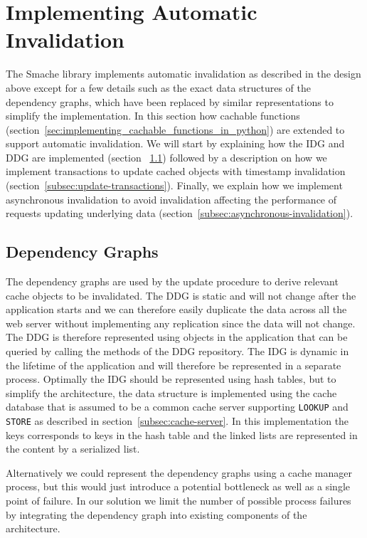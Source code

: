 
\section{Implementing Automatic Invalidation}
\label{sec:implementing-automatic-invalidation}

The Smache library implements automatic invalidation as described in the design above except for a few details such as the exact data structures of the dependency graphs, which have been replaced by similar representations to simplify the implementation. In this section how cachable functions (section~\ref{sec:implementing_cachable_functions_in_python}) are extended to support automatic invalidation. We will start by explaining how the IDG and DDG are implemented (section ~\ref{subsec:dependency-graphs}) followed by a description on how we implement transactions to update cached objects with timestamp invalidation (section~\ref{subsec:update-transactions}). Finally, we explain how we implement asynchronous invalidation to avoid invalidation affecting the performance of requests updating underlying data (section~\ref{subsec:asynchronous-invalidation}).

\subsection{Dependency Graphs}
\label{subsec:dependency-graphs}

The dependency graphs are used by the update procedure to derive relevant cache objects to be invalidated.
The DDG is static and will not change after the application starts and we can therefore easily duplicate the data across all the web server without implementing any replication since the data will not change. The DDG is therefore represented using objects in the application that can be queried by calling the methods of the DDG repository.
The IDG is dynamic in the lifetime of the application and will therefore be represented in a separate process. Optimally the IDG should be represented using hash tables, but to simplify the architecture, the data structure is implemented using the cache database that is assumed to be a common cache server supporting \verb$LOOKUP$ and \verb$STORE$ as described in section~\ref{subsec:cache-server}. In this implementation the keys corresponds to keys in the hash table and the linked lists are represented in the content by a serialized list.

Alternatively we could represent the dependency graphs using a cache manager process, but this would just introduce a potential bottleneck as well as a single point of failure. In our solution we limit the number of possible process failures by integrating the dependency graph into existing components of the architecture.

